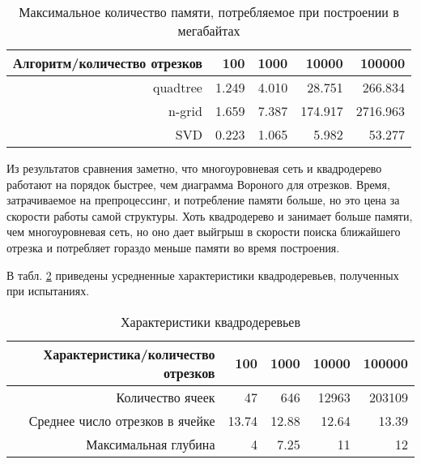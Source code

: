 \begin{table}[ht]
\centering
\begin{tabular}{|r|r|r|r|r|}

\hline
Алгоритм/количество отрезков & 100 & 1000 & 10000 & 100000 \\
\hline
quadtree & 1.249 & 4.010 &  28.751 &  266.834 \\
n-grid   & 1.659 & 7.387 & 174.917 & 2716.963 \\
SVD      & 0.223 & 1.065 &   5.982 &   53.277 \\
\hline

\end{tabular}
\caption{Максимальное количество памяти, потребляемое при построении в мегабайтах}
\label{max_mem_usage}
\end{table}

\FloatBarrier
Из результатов сравнения заметно, что многоуровневая сеть и
квадродерево работают на порядок быстрее, чем диаграмма Вороного для отрезков. Время, затрачиваемое на
препроцессинг, и потребление памяти больше, но это цена за скорости работы самой структуры.
Хоть квадродерево и занимает больше памяти, чем многоуровневая сеть, но
оно дает выйгрыш в скорости поиска ближайшего отрезка и потребляет гораздо 
меньше памяти во время построения.

В табл. \ref{qt_char} приведены усредненные характеристики квадродеревьев,
полученных при испытаниях.


\begin{table}[ht]
\centering
\begin{tabular}{|r|r|r|r|r|}

\hline
Характеристика/количество отрезков & 100 & 1000 & 10000 & 100000 \\
\hline
Количество ячеек                & 47    & 646    & 12963    & 203109 \\
Среднее число отрезков в ячейке & 13.74 &  12.88 &    12.64 &     13.39 \\
Максимальная глубина            &  4    &   7.25 &    11    &     12 \\
\hline

\end{tabular}
\caption{Характеристики квадродеревьев}
\label{qt_char}
\end{table}

\FloatBarrier

